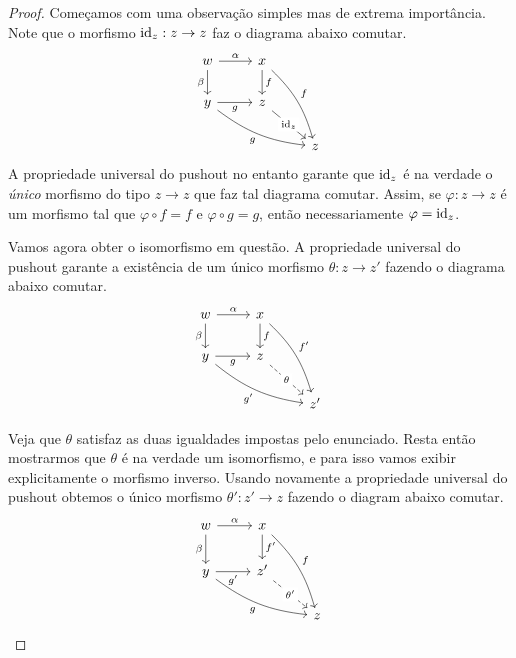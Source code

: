 \begin{proof}
    Começamos com uma observação simples mas de extrema importância.
    Note que o morfismo $\mathrm{id}_z: z \to z$ faz o diagrama abaixo comutar.
    \begin{displaymath}
        \begin{tikzcd}
            w
            \arrow[r, "\alpha"]
            \arrow[d, "\beta" swap]
            & x
            \arrow[d, "f"]
            \arrow[rdd, bend left=15, "f"]
            \\ y
            \arrow[r, "g" swap]
            \arrow[rrd, bend right=15, "g" swap]
            & z
            \arrow[rd, "\id_z" description]
            \\ & & z
        \end{tikzcd}
    \end{displaymath}
    A propriedade universal do pushout no entanto garante que $\mathrm{id}_z$ é na verdade o \emph{único} morfismo do tipo $z \to z$ que faz tal diagrama comutar.
    Assim, se $\varphi: z \to z$ é um morfismo tal que $\varphi \circ f = f$ e $\varphi \circ g = g$, então necessariamente $\varphi = \mathrm{id}_z$.

    Vamos agora obter o isomorfismo em questão.
    A propriedade universal do pushout garante a existência de um único morfismo $\theta: z \to z'$ fazendo o diagrama abaixo comutar.
    \begin{displaymath}
        \begin{tikzcd}
            w
            \arrow[r, "\alpha"]
            \arrow[d, "\beta" swap]
            & x
            \arrow[d, "f"]
            \arrow[rdd, bend left=15, "f'"]
            \\ y
            \arrow[r, "g" swap]
            \arrow[rrd, bend right=15, "g'" swap]
            & z
            \arrow[rd, dashed, "\theta" description]
            \\ & & z'
        \end{tikzcd}
    \end{displaymath}
    
    Veja que $\theta$ satisfaz as duas igualdades impostas pelo enunciado.
    Resta então mostrarmos que $\theta$ é na verdade um isomorfismo, e para isso vamos exibir explicitamente o morfismo inverso.
    Usando novamente a propriedade universal do pushout obtemos o único morfismo $\theta': z' \to z$ fazendo o diagram abaixo comutar.
    \begin{displaymath}
        \begin{tikzcd}
            w
            \arrow[r, "\alpha"]
            \arrow[d, "\beta" swap]
            & x
            \arrow[d, "f'"]
            \arrow[rdd, bend left=15, "f"]
            \\ y
            \arrow[r, "g'" swap]
            \arrow[rrd, bend right=15, "g" swap]
            & z'
            \arrow[rd, dashed, "\theta'" description]
            \\ & & z
        \end{tikzcd}
    \end{displaymath}


\end{proof}
